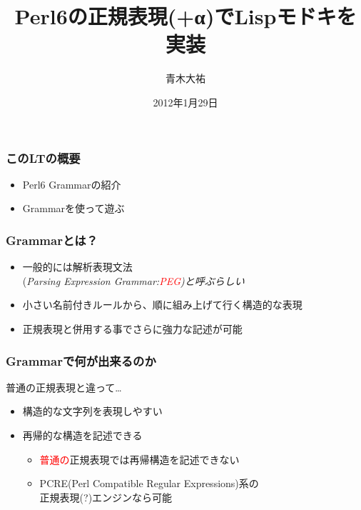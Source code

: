 \documentclass[14pt,dvipdfm,trans]{beamer}
\title{Perl6の正規表現(+α)でLispモドキを実装}
\author{青木大祐}
\institute{筑波大学 情報科学類}
\date{2012年1月29日}
\begin{document}
\frame{\titlepage}
\begin{frame}
 \frametitle{このLTの概要}
 \vspace{2zh}
 \begin{itemize}
  \item Perl6 Grammarの紹介
	\vspace{3zh}
  \item Grammarを使って遊ぶ       
 \end{itemize}
 \vspace{2zh}
 \end{frame}

\begin{frame}
 \frametitle{Grammarとは？}
 \begin{itemize}
  \item <1-> 一般的には解析表現文法\\(\it{Parsing Expression Grammar:\textcolor{red}{PEG}})と呼ぶらしい
  \item <2-> 小さい名前付きルールから、順に組み上げて行く構造的な表現
  \item <3-> 正規表現と併用する事でさらに強力な記述が可能
 \end{itemize}
\end{frame}

\begin{frame}
\frametitle{Grammarで何が出来るのか}
普通の正規表現と違って…
\vspace{1zh}
\begin{itemize}
 \item <2-> 構造的な文字列を表現しやすい
 \item <3-> 再帰的な構造を記述できる

       \begin{itemize}
	\item <4-> \textcolor{red}{普通の}正規表現では再帰構造を記述できない
	\item <5-> PCRE(Perl Compatible Regular Expressions)系の\\
	      正規表現(?)エンジンなら可能
       \end{itemize}
\end{itemize}
\pause
\vspace{2zh}
\hspace{2zh}
\end{frame}
\end{document}
